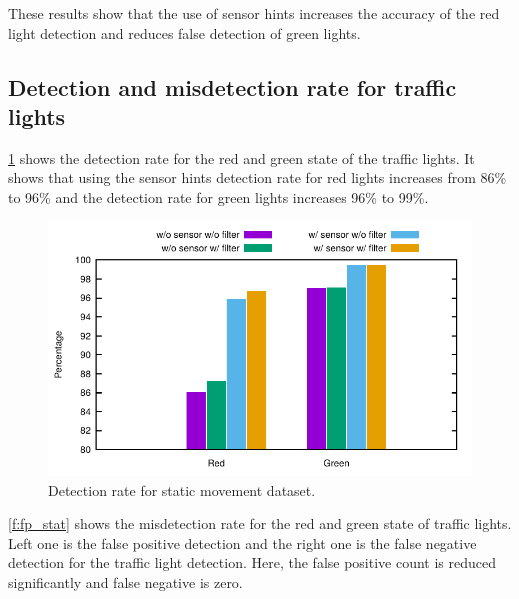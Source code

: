 These results show that the use of sensor hints increases the accuracy of the red light detection and reduces false detection of green lights.


\subsection{Detection and misdetection rate for traffic lights}
\ref{f:tp_stat} shows the detection rate for the red and green state of the traffic lights.
It shows that using the sensor hints detection rate for red lights increases from 86\% to 96\% and the detection rate for green lights increases 96\% to 99\%.

\begin{figure}[h!]
\centering
\includegraphics[width=5.2in]{plots/bar_tp.pdf}
\caption{Detection rate for static movement dataset.}
\label{f:tp_stat}
\end{figure}

\ref{f:fp_stat} shows the misdetection rate for the red and green state of traffic lights.
Left one is the false positive detection and the right one is the false negative detection for the traffic light detection.
Here, the false positive count is reduced significantly and false negative is zero.

